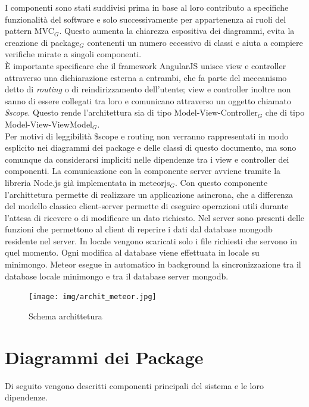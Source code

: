 I componenti sono stati suddivisi prima in base al loro contributo a specifiche funzionalità del software e solo successivamente per appartenenza ai ruoli del pattern MVC$_G$. Questo aumenta la chiarezza espositiva dei diagrammi, evita la creazione di package$_G$ contenenti un numero eccessivo di classi e aiuta a compiere verifiche mirate a singoli componenti. \\
È importante specificare che il framework AngularJS unisce view e controller attraverso una dichiarazione esterna a entrambi, che fa parte del meccanismo detto di \textit{routing} o di reindirizzamento dell'utente; view e controller inoltre non sanno di essere collegati tra loro e comunicano attraverso un oggetto chiamato \textit{\$scope}. Questo rende l'architettura sia di tipo Model-View-Controller$_G$ che di tipo Model-View-ViewModel$_G$. \\
Per motivi di leggibilità \$scope e routing non verranno rappresentati in modo esplicito nei diagrammi dei package e delle classi di questo documento, ma sono comunque da considerarsi impliciti nelle dipendenze tra i view e controller dei componenti.
La comunicazione con la componente server avviene tramite la libreria Node.js già implementata in meteorjs$_G$. Con questo componente l'archittetura permette di realizzare un applicazione asincrona, che a differenza del modello classico client-server permette di eseguire operazioni utili durante l'attesa di ricevere o di modificare un dato richiesto.
Nel server sono presenti delle funzioni che permettono al client di reperire i dati dal database mongodb residente nel server. In locale vengono scaricati solo i file richiesti che servono in quel momento. Ogni modifica al database viene effettuata in locale su minimongo. Meteor esegue in automatico in background la sincronizzazione tra il database locale minimongo e tra il database server mongodb.

\begin{figure}[h]
\begin{center}
\texttt{[image: img/archit\_meteor.jpg]}
\caption{Schema archittetura}
\end{center}
\end{figure}

\newpage
\section{Diagrammi dei Package}
Di seguito vengono descritti componenti principali del sistema e le loro dipendenze.

